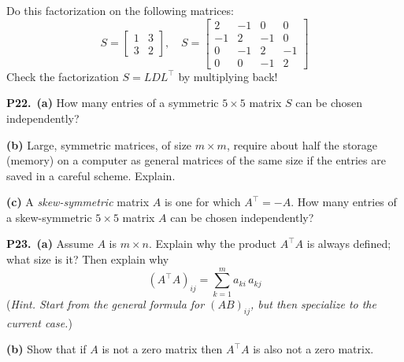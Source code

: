 \documentclass[12pt]{amsart}
\newcommand{\prob}[1]{\bigskip\noindent\textbf{#1.}\quad }
\newcommand{\epart}[1]{\medskip\noindent\textbf{(#1)}\quad }
\newcommand{\ppart}[1]{\,\textbf{(#1)}\quad }
\begin{document}
Do this factorization on the following matrices:
    $$S = \begin{bmatrix} 1 & 3 \\ 3 & 2 \end{bmatrix}, \quad S = \begin{bmatrix} 2 & -1 & 0 & 0 \\ -1 & 2 & -1 & 0 \\ 0 & -1 & 2 & -1 \\ 0 & 0 & -1 & 2 \end{bmatrix}$$
Check the factorization $S=L D L^\top$ by multiplying back!
\begin{comment}
>> S = [2 -1 0 0; -1 2 -1 0; 0 -1 2 -1; 0 0 -1 2];
>> Z = S;
>> Z(2,:) = Z(2,:) - (-1/2) * Z(1,:);
>> Z(3,:) = Z(3,:) - (-1/(3/2)) * Z(2,:);
>> Z(4,:) = Z(4,:) - (-1/(4/3)) * Z(3,:);
>> U = Z
U =
   2.00000  -1.00000   0.00000   0.00000
   0.00000   1.50000  -1.00000   0.00000
   0.00000   0.00000   1.33333  -1.00000
   0.00000   0.00000   0.00000   1.25000
>> L = eye(4); L(2,1) = -1/2; L(3,2) = -2/3; L(4,3) = -3/4
L =
   1.00000   0.00000   0.00000   0.00000
  -0.50000   1.00000   0.00000   0.00000
   0.00000  -0.66667   1.00000   0.00000
   0.00000   0.00000  -0.75000   1.00000
>> D = diag(diag(U))
D =
   2.00000   0.00000   0.00000   0.00000
   0.00000   1.50000   0.00000   0.00000
   0.00000   0.00000   1.33333   0.00000
   0.00000   0.00000   0.00000   1.25000
>> norm(S - L*D*L')
ans = 0
\end{comment}


\prob{P22}  \ppart{a}  How many entries of a symmetric $5\times 5$ matrix $S$ can be chosen independently?

\epart{b}  Large, symmetric matrices, of size $m\times m$, require about half the storage (memory) on a computer as general matrices of the same size if the entries are saved in a careful scheme.  Explain.

\epart{c}  A \emph{skew-symmetric} matrix $A$ is one for which $A^\top = -A$.  How many entries of a skew-symmetric $5\times 5$ matrix $A$ can be chosen independently?


\prob{P23} \ppart{a}  Assume $A$ is $m\times n$.  Explain why the product $A^\top A$ is always defined; what size is it?  Then explain why
    $$(A^\top A)_{ij} = \sum_{k=1}^m a_{ki}\, a_{kj}$$
(\emph{Hint.  Start from the general formula for $(AB)_{ij}$, but then specialize to the current case.})

\epart{b}  Show that if $A$ is not a zero matrix then $A^\top A$ is also not a zero matrix.
\end{document}
